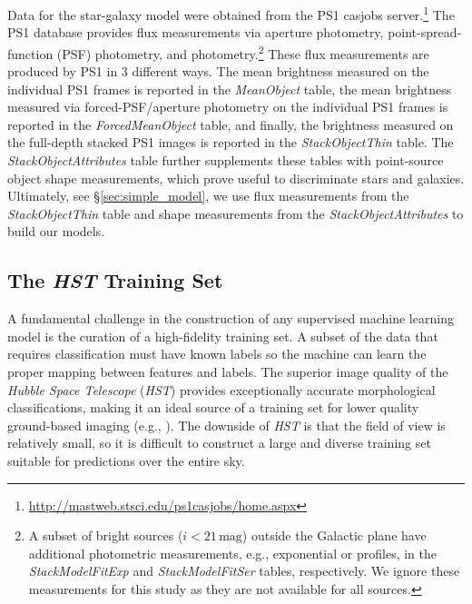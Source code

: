 \documentclass[twocolumn]{aastex62}
\begin{document}
Data for the star-galaxy model were obtained from the PS1 casjobs
server.\footnote{\url{http://mastweb.stsci.edu/ps1casjobs/home.aspx}} The PS1
database provides flux measurements via aperture photometry,
point-spread-function (PSF) photometry, and \citet{Kron80}
photometry.\footnote{A subset of bright sources ($i < 21\,\mathrm{mag}$)
outside the Galactic plane have additional photometric measurements, e.g.,
exponential or \citet{Sersic63} profiles, in the \textit{StackModelFitExp} and
\textit{StackModelFitSer} tables, respectively. We ignore these measurements
for this study as they are not available for all sources.} These flux
measurements are produced by PS1 in 3 different ways. The mean brightness
measured on the individual PS1 frames is reported in the \textit{MeanObject}
table, the mean brightness measured via forced-PSF/aperture photometry on the
individual PS1 frames is reported in the \textit{ForcedMeanObject} table, and
finally, the brightness measured on the full-depth stacked PS1 images is
reported in the \textit{StackObjectThin} table. The
\textit{StackObjectAttributes} table further supplements these tables with
point-source object shape measurements, which prove useful to discriminate
stars and galaxies. Ultimately, see \S\ref{sec:simple_model}, we use flux
measurements from the \textit{StackObjectThin} table and shape measurements
from the \textit{StackObjectAttributes} to build our models.

\subsection{The \textit{HST} Training Set} \label{sec:hst_train}

A fundamental challenge in the construction of any supervised machine learning
model is the curation of a high-fidelity training set. A subset of the data
that requires classification must have known labels so the machine can learn
the proper mapping between features and labels. The superior image quality of
the \textit{Hubble Space Telescope} (\textit{HST}) provides exceptionally
accurate morphological classifications, making it an ideal source of a training
set for lower quality ground-based imaging (e.g., \citealt{Lupton01}). The
downside of \textit{HST} is that the field of view is relatively small, so it
is difficult to construct a large and diverse training set suitable for
predictions over the entire sky.
\end{document}
